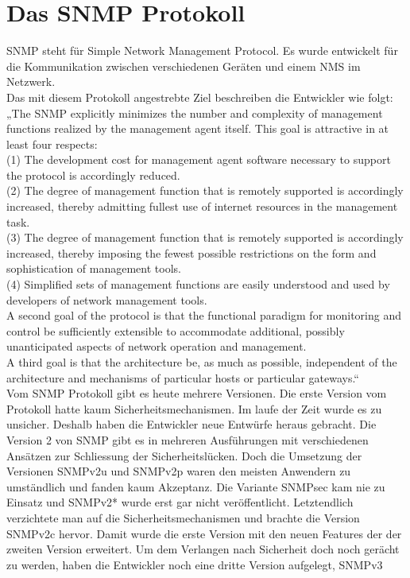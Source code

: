 \documentclass[11pt,a4paper]{article}
\begin{document}
\section{Das SNMP Protokoll}
SNMP steht für Simple Network Management Protocol. Es wurde entwickelt für die Kommunikation zwischen verschiedenen Geräten und einem NMS im Netzwerk.\\
\emptyline
Das mit diesem Protokoll angestrebte Ziel beschreiben die Entwickler wie folgt:\\
„The SNMP explicitly minimizes the number and complexity of management functions realized by the management agent itself.  This goal is attractive in at least four respects:\\
      (1)  The development cost for management agent software necessary to support the protocol is 	accordingly reduced.\\
      (2)  The degree of management function that is remotely supported is accordingly increased, 	thereby admitting fullest use of internet resources in the management task.\\
      (3)  The degree of management function that is remotely supported is accordingly increased, 	thereby imposing the fewest possible restrictions on the form and sophistication of 		management tools.\\
      (4)  Simplified sets of management functions are easily understood and used by developers of 	network management tools.\\
\emptyline
A second goal of the protocol is that the functional paradigm for monitoring and control be sufficiently extensible to accommodate additional, possibly unanticipated aspects of network operation and management.\\
\emptyline
A third goal is that the architecture be, as much as possible, independent of the architecture and mechanisms of particular hosts or particular gateways.“
\cite{rfcSnmpGoals}\\
\emptyline
Vom SNMP Protokoll gibt es heute mehrere Versionen. Die erste Version vom Protokoll hatte kaum Sicherheitsmechanismen. Im laufe der Zeit wurde es zu unsicher. Deshalb haben die Entwickler neue Entwürfe heraus gebracht. Die Version 2 von SNMP gibt es in mehreren Ausführungen mit verschiedenen Ansätzen zur Schliessung der Sicherheitslücken. Doch die Umsetzung der Versionen SNMPv2u und SNMPv2p waren den meisten Anwendern zu umständlich und fanden kaum Akzeptanz. Die Variante SNMPsec kam nie zu Einsatz und SNMPv2* wurde erst gar nicht veröffentlicht. Letztendlich verzichtete man auf die Sicherheitsmechanismen und brachte die Version SNMPv2c hervor. Damit wurde die erste Version mit den neuen Features der der zweiten Version erweitert. Um dem Verlangen nach Sicherheit doch noch gerächt zu werden, haben die Entwickler noch eine dritte Version aufgelegt, SNMPv3\\
\end{document}
